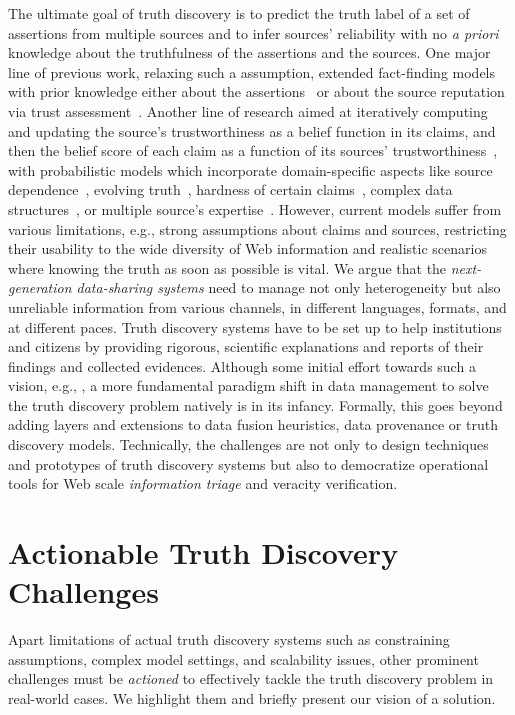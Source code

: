 \documentclass[prodmode,acmtecs]{acmsmall} %
\begin{document}
The ultimate goal of truth discovery is to predict the truth label of a set of assertions from multiple sources
 and to infer sources' reliability with no \emph{a priori} knowledge about the truthfulness of the assertions and the sources. One 
major line of previous work, relaxing such a assumption, extended fact-finding models with prior knowledge either about the assertions~\cite{PasternackR13} 
or about the source reputation via trust assessment~\cite{BalakrishnanK11}. Another line of research aimed at iteratively computing and updating the source's
trustworthiness as a belief function in its claims, and then the belief score of each claim as a function of its sources' trustworthiness~\cite{YinHY08}, with 
probabilistic models which incorporate domain-specific aspects like source dependence~\cite{DongBHS10a}, evolving truth~\cite{DongBS09a}, hardness of certain 
claims~\cite{GallandAMS10}, complex data structures~\cite{ZhaoRGH12,GoasdoueKKLMZ13}, or multiple source's expertise~\cite{Ma15}. However, current models suffer 
from various limitations, e.g., strong assumptions about claims and sources, restricting their usability to the wide diversity of Web information and realistic 
scenarios where knowing the truth as soon as possible is vital. 
 We argue that the \emph{next-generation data-sharing systems} need to manage not only heterogeneity but also unreliable 
 information from various channels, in different languages, formats, and at different paces. Truth discovery systems 
 have to be set up to help institutions and citizens by providing rigorous, scientific explanations and reports 
 of their findings and collected evidences. Although some initial effort towards such a vision,
 e.g., \cite{DongS2013,DongBHS10a,LiDLMS12}, a more fundamental paradigm shift in data
 management to solve the truth discovery problem natively is in its infancy. Formally, this goes beyond adding layers and extensions to
 data fusion heuristics, data provenance or truth discovery models. Technically, the challenges are not only to  design 
 techniques and prototypes of truth discovery systems but also to democratize operational tools for Web scale \emph{information
 triage} and veracity verification.
  
  
  

 
\section{Actionable Truth Discovery Challenges}
Apart limitations of actual truth discovery systems such as constraining assumptions, complex model settings, and scalability issues, other
prominent challenges must be \emph{actioned} to effectively tackle the truth discovery problem in real-world cases. We highlight them and briefly
present our vision of a solution.
\end{document}
